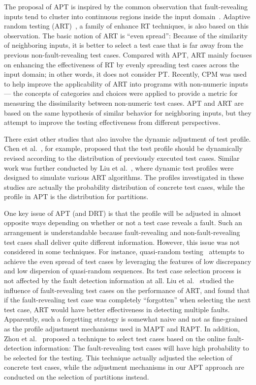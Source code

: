 \documentclass[10pt,journal,compsoc]{IEEEtran}
\begin{document}
The proposal of APT is inspired by the common observation that fault-revealing inputs tend to cluster into continuous regions inside the input domain~\cite{White80, Ammann88, Finelli91, Bishop93, Koru08}. Adaptive random testing (ART)~\cite{Chen10}, a family of enhance RT techniques, is also based on this observation. The basic notion of ART is ``even spread'': Because of the similarity of neighboring inputs, it is better to select a test case that is far away from the previous non-fault-revealing test cases. Compared with APT, ART mainly focuses on enhancing the effectiveness of RT by evenly spreading test cases across the input domain; in other words, it does not consider PT. Recently, CPM was used to help improve the applicability of ART into programs with non-numeric inputs~\cite{Barus16} --- the concepts of categories and choices were applied to provide a metric for measuring the dissimilarity between non-numeric test cases.
APT and ART are based on the same hypothesis of similar behavior for neighboring inputs, but they attempt to improve the testing effectiveness from different perspectives.

There exist other studies that also involve the dynamic adjustment of test profile. Chen et al.~\cite{Chen09}, for example, proposed that the test profile should be dynamically revised according to the distribution of previously executed test cases. Similar work was further conducted by Liu et al.~\cite{Liu11}, where dynamic test profiles were designed to simulate various ART algorithms. The profiles investigated in these studies are actually the probability distribution of concrete test cases, while the profile in APT is the distribution for partitions.

One key issue of APT (and DRT) is that the profile will be adjusted in almost opposite ways depending on whether or not a test case reveals a fault. Such an arrangement is understandable because fault-revealing and non-fault-revealing test cases shall deliver quite different information. However, this issue was not considered in some techniques. For instance, quasi-random testing~\cite{Chen07, Liu16} attempts to achieve the even spread of test cases by leveraging the features of low discrepancy and low dispersion of quasi-random sequences. Its test case selection process is not affected by the fault detection information at all. Liu et al.~\cite{Liu12} studied the influence of fault-revealing test cases on the performance of ART, and found that if the fault-revealing test case was completely ``forgotten'' when selecting the next test case, ART would have better effectiveness in detecting multiple faults. Apparently, such a forgetting strategy is somewhat naive and not as fine-grained as the profile adjustment mechanisms used in MAPT and RAPT. In addition, Zhou et al.~\cite{Zhou09} proposed a technique to select test cases based on the online fault-detection information: The fault-revealing test cases will have high probability to be selected for the testing. This technique actually adjusted the selection of concrete test cases, while the adjustment mechanisms in our APT approach are conducted on the selection of partitions instead.
\end{document}
